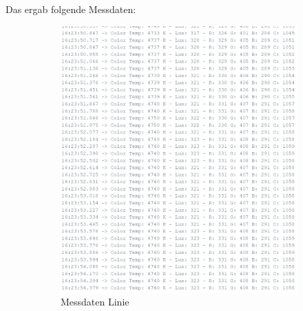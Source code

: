 Das ergab folgende Messdaten:


\begin{figure}[H]
    \centering
    \begin{subfigure}{0.35\textwidth} %
        \centering
        \includegraphics[width=\linewidth]{img/sensortest/MD_Linie_101ms.png}
        \caption{Messdaten Linie}
        \label{fig:MD_Farbsens}
    \end{subfigure}
    \begin{subfigure}{0.35\textwidth}
        \centering

\end{subfigure}
\end{figure}
